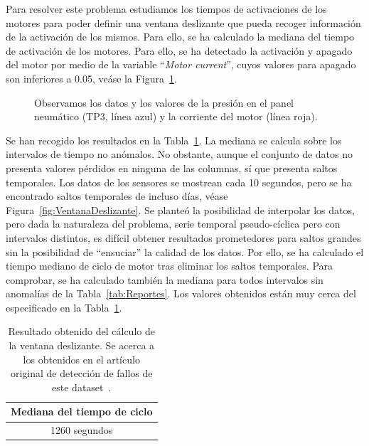 \documentclass[12pt,letterpaper]{article}
\begin{document}
Para resolver este problema estudiamos los tiempos de activaciones de los motores para poder definir una ventana deslizante que pueda recoger información de la activación de los mismos. 
Para ello, se ha calculado la mediana del tiempo de activación de los motores. Para ello, se ha detectado la activación y apagado del motor por medio de la variable ``\textit{Motor current}'', cuyos 
valores para apagado son inferiores a 0.05, veáse la Figura~\ref{fig:VisualizacionDatos}.

\begin{figure}[htp]
        \centering
        \caption{Observamos los datos y los valores de la presión en el panel neumático (TP3, línea azul) y la corriente del motor (línea roja).}
        \label{fig:VisualizacionDatos}
\end{figure}

Se han recogido los resultados en la Tabla~\ref{tab:TiempoCiclo}. La mediana se calcula sobre los intervalos de tiempo no anómalos. No obstante, 
aunque el conjunto de datos no presenta valores pérdidos en ninguna de las columnas, sí que presenta saltos temporales. Los datos de los sensores se mostrean cada 10 segundos, 
pero se ha encontrado saltos temporales de incluso días, véase Figura~\ref{fig:VentanaDeslizante}. Se planteó la posibilidad de interpolar los datos, pero dada la naturaleza 
del problema, serie temporal pseudo-cíclica pero con intervalos distintos, es difícil obtener resultados prometedores para saltos grandes sin la posibilidad de ``ensuciar'' la calidad de los datos.
Por ello, se ha calculado el tiempo mediano de ciclo de motor tras eliminar los saltos temporales. Para comprobar, se ha calculado también la mediana 
para todos intervalos sin anomalías de la Tabla~\ref{tab:Reportes}. Los valores obtenidos están muy cerca del especificado en la Tabla~\ref{tab:TiempoCiclo}.

\begin{table}[htp]
    \centering
    \begin{tabular}{c}
    \hline
    \textbf{Mediana del tiempo de ciclo} \\ \hline 
    1260 segundos\\
    \hline
    \end{tabular}
    \caption{Resultado obtenido del cálculo de la ventana deslizante. Se acerca a los obtenidos en el artículo original de detección de fallos de este dataset~\cite{FailureDetection}.}
    \label{tab:TiempoCiclo}
\end{table}
\end{document}
